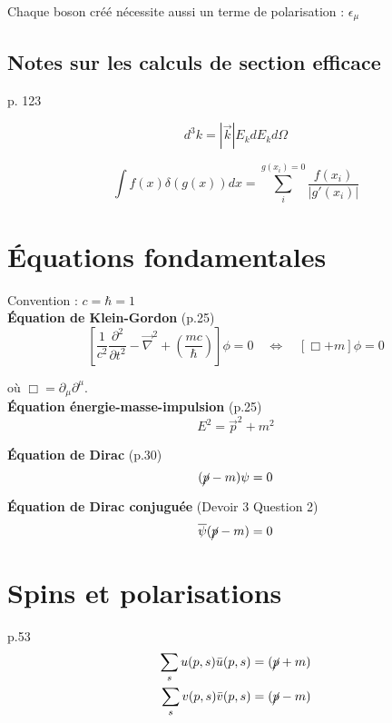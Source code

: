 \documentclass[12pt]{article}
\begin{document}
\hfill \break
Chaque boson créé nécessite aussi un terme de polarisation : $\epsilon_\mu$

\subsection{Notes sur les calculs de section efficace}

p. 123 

\begin{equation}
  d^3 k = |\vec{k}| E_k dE_k d\Omega
\end{equation}

\begin{equation}
  \int f(x) \delta(g(x)) dx = \sum_i^{g(x_i)=0} \frac{f(x_i)}{|g'(x_i)|}
\end{equation}

\section{Équations fondamentales}
Convention : $c=\hbar=1$ \\

\textbf{Équation de Klein-Gordon} (p.25)
\begin{equation}
    \left[\frac{1}{c^2}\frac{\partial^2}{\partial t^2} - \Vec{\nabla}^2 + \left(\frac{mc}{\hbar}\right)\right]\phi = 0 \quad \iff \quad [\Box + m] \phi = 0
\end{equation}

où $\Box = \partial_\mu\partial^\mu$.\\

\textbf{Équation énergie-masse-impulsion} (p.25)
\begin{equation}
    E^2 = \Vec{p}^2 + m^2
\end{equation}

\textbf{Équation de Dirac} (p.30)
\begin{equation}
    (\cancel{p} -m )\psi = 0
\end{equation}

\textbf{Équation de Dirac conjuguée} (Devoir 3 Question 2)
\begin{equation}
    \overline{\psi}(\cancel{p} -m ) = 0
\end{equation}


\section{Spins et polarisations}
p.53
\begin{align}
    \sum_s u(p,s)\Bar{u}(p,s) &= (\cancel{p}+m)\\
    \sum_s v(p,s)\Bar{v}(p,s) &= (\cancel{p}-m)
\end{align}
\end{document}
